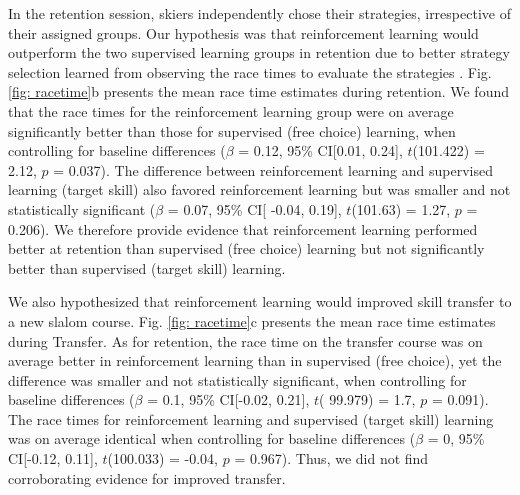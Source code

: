 \documentclass[pdflatex,sn-mathphys-num]{sn-jnl}%
\theoremstyle{thmstyleone}%
\theoremstyle{thmstyletwo}%
\theoremstyle{thmstylethree}%
\begin{document}
In the retention session, skiers independently chose their strategies, irrespective of their assigned groups.  Our hypothesis was that reinforcement learning would outperform the two supervised learning groups in retention due to better strategy selection learned from observing the race times to evaluate the strategies . Fig. \ref{fig: racetime}b presents the mean race time estimates during retention. We found that the race times for the reinforcement learning group were on average significantly better than those for supervised (free choice) learning, when controlling for baseline differences ($\beta$ = 0.12, 95\% CI[0.01, 0.24], $t$(101.422) = 2.12, $p$ = 0.037). The difference between reinforcement learning and supervised learning (target skill) also favored reinforcement learning but was smaller and not statistically significant ($\beta$ = 0.07, 95\% CI[ -0.04, 0.19], $t$(101.63) = 1.27, $p$ = 0.206). We therefore provide evidence that reinforcement learning performed better at retention than supervised (free choice) learning but not significantly better than supervised (target skill) learning. 

We also hypothesized that reinforcement learning would improved skill transfer to a new slalom course. Fig. \ref{fig: racetime}c presents the mean race time estimates during Transfer. As for retention, the race time on the transfer course was on average better in reinforcement learning than in supervised (free choice), yet the difference was smaller and not statistically significant, when controlling for baseline differences ($\beta$ = 0.1, 95\% CI[-0.02, 0.21], $t$( 99.979) = 1.7, $p$  = 0.091). The race times for reinforcement learning and supervised (target skill) learning was on average identical when controlling for baseline differences ($\beta$ = 0, 95\% CI[-0.12, 0.11], $t$(100.033) = -0.04, $p$ = 0.967). Thus, we did not find corroborating evidence for improved transfer.
\end{document}
